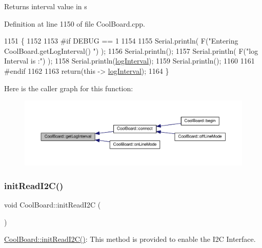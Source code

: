 \begin{DoxyReturn}{Returns}
interval value in s 
\end{DoxyReturn}


Definition at line 1150 of file Cool\+Board.\+cpp.


\begin{DoxyCode}
1151 \{
1152 
1153 \textcolor{preprocessor}{#if DEBUG == 1}
1154 
1155     Serial.println( F(\textcolor{stringliteral}{"Entering CoolBoard.getLogInterval() "}) );
1156     Serial.println();
1157     Serial.println( F(\textcolor{stringliteral}{"log Interval is :"}) );
1158     Serial.println(\hyperlink{class_cool_board_a84bc94413b64973e4aba8c467c97006c}{logInterval});
1159     Serial.println();
1160 
1161 \textcolor{preprocessor}{#endif}
1162 
1163     \textcolor{keywordflow}{return}(\textcolor{keyword}{this} -> \hyperlink{class_cool_board_a84bc94413b64973e4aba8c467c97006c}{logInterval});
1164 \}
\end{DoxyCode}
Here is the caller graph for this function\+:\nopagebreak
\begin{figure}[H]
\begin{center}
\leavevmode
\includegraphics[width=350pt]{d7/df9/class_cool_board_a7508e029f2ee17bb747ffab599285e0d_icgraph}
\end{center}
\end{figure}
\mbox{\label{class_cool_board_a397b46fadab8f530a8cf4d914c561366}} 
\subsubsection{\texorpdfstring{init\+Read\+I2\+C()}{initReadI2C()}}
{\footnotesize\ttfamily void Cool\+Board\+::init\+Read\+I2C (\begin{DoxyParamCaption}{ }\end{DoxyParamCaption})}

\hyperlink{class_cool_board_a397b46fadab8f530a8cf4d914c561366}{Cool\+Board\+::init\+Read\+I2\+C()}\+: This method is provided to enable the I2C Interface. 

